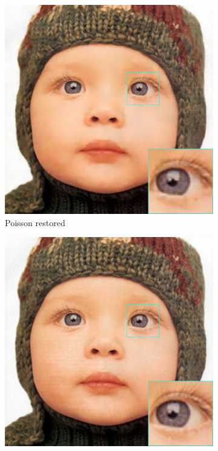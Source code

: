 \begin{figure}
\begin{subfigure}{0.24\textwidth}
		\includegraphics[width=\textwidth]{images/exp2.1/poisson.png}
		\caption{Poisson restored}
	\end{subfigure}
	\begin{subfigure}{0.24\textwidth}
		\includegraphics[width=\textwidth]{images/exp2.1/salt.png}

\end{subfigure}
\end{figure}
